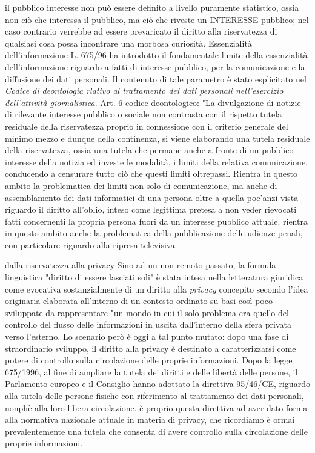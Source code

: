 il pubblico interesse non può essere definito a livello puramente statistico, ossia non ciò che interessa il pubblico, ma ciò che riveste un INTERESSE pubblico; nel caso contrario verrebbe ad essere prevaricato il diritto alla riservatezza di qualsiasi cosa possa incontrare una morbosa curiosità.
{Essenzialità dell'informazione}
L. 675/96 ha introdotto il fondamentale limite della essenzialità dell'informazione riguardo a fatti di interesse pubblico, per la comunicazione e la diffusione dei dati personali.
Il contenuto di tale parametro è stato esplicitato nel \textit{Codice di deontologia rlativo al trattamento dei dati personali nell'esercizio dell'attività giornalistica}.
Art. 6 codice deontologico:
"La divulgazione di notizie di rilevante interesse pubblico o sociale non contrasta con il rispetto
{tutela residuale della riservatezza}
proprio in connessione con il criterio generale del minimo mezzo e dunque della continenza, si viene elaborando una tutela residuale della riservatezza, ossia una tutela che permane anche a fronte di un pubblico interesse della notizia ed investe le modalità, i limiti della relativa comunicazione, conducendo a censurare tutto ciò che questi limiti oltrepassi. Rientra in questo ambito la problematica dei limiti non solo di comunicazione, ma anche di assemblamento dei dati informatici di una persona oltre a quella poc'anzi vista riguardo il diritto all'oblio, inteso come legittima pretesa a non veder rievocati fatti concernenti la propria persona fuori da un interesse pubblico attuale. rientra in questo ambito anche la problematica della pubblicazione delle udienze penali, con particolare riguardo alla ripresa televisiva.


{dalla riservatezza alla privacy}
Sino ad un non remoto passato, la formula linguistica "diritto di essere lasciati soli" è stata intesa nella letteratura giuridica come evocativa sostanzialmente di un diritto alla \textit{privacy} concepito secondo l'idea originaria elaborata all'interno di un contesto ordinato su basi così poco sviluppate da rappresentare "un mondo in cui il solo problema era quello del controllo del flusso delle informazioni in uscita dall'interno della sfera privata verso l'esterno.
Lo scenario però è oggi a tal punto mutato: dopo una fase di straordinario sviluppo, il diritto alla privacy è destinato a caratterizzarsi come potere di controllo sulla circolazione delle proprie informazioni.
Dopo la legge 675/1996, al fine di ampliare la tutela dei diritti e delle libertà delle persone, il Parlamento europeo e il Consiglio hanno adottato la direttiva 95/46/CE, riguardo alla tutela delle persone fisiche con riferimento al trattamento dei dati personali, nonphè alla loro libera circolazione.
è proprio questa direttiva ad aver dato forma alla normativa nazionale attuale in materia di privacy, che ricordiamo è ormai prevalentemente  una tutela che consenta di avere controllo sulla circolazione delle proprie informazioni.

